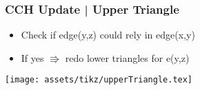 \begin{frame}
    \frametitle{CCH Update | Upper Triangle}
    \begin{itemize}
        \item Check if edge(y,z) could rely in edge(x,y)
        \item If yes $\Rrightarrow$ redo lower triangles for e(y,z)
    \end{itemize}

    \texttt{[image: assets/tikz/upperTriangle.tex]}

\end{frame}